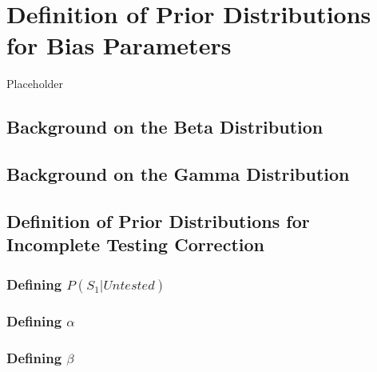 \documentclass[12pt,twoside]{smiththesis}
\begin{document}
\hypertarget{definition-of-prior-distributions-for-bias-parameters}{%
\chapter{Definition of Prior Distributions for Bias Parameters}\label{definition-of-prior-distributions-for-bias-parameters}}

Placeholder

\hypertarget{background-on-the-beta-distribution}{%
\section{Background on the Beta Distribution}\label{background-on-the-beta-distribution}}

\hypertarget{background-on-the-gamma-distribution}{%
\section{Background on the Gamma Distribution}\label{background-on-the-gamma-distribution}}

\hypertarget{definition-of-prior-distributions-for-incomplete-testing-correction}{%
\section{Definition of Prior Distributions for Incomplete Testing Correction}\label{definition-of-prior-distributions-for-incomplete-testing-correction}}

\hypertarget{defining-ps_1untested}{%
\subsection{\texorpdfstring{Defining \(P(S_1|Untested)\)}{Defining P(S\_1\textbar Untested)}}\label{defining-ps_1untested}}

\hypertarget{defining-alpha}{%
\subsection{\texorpdfstring{Defining \(\alpha\)}{Defining \textbackslash alpha}}\label{defining-alpha}}

\hypertarget{defining-beta}{%
\subsection{\texorpdfstring{Defining \(\beta\)}{Defining \textbackslash beta}}\label{defining-beta}}
\end{document}
